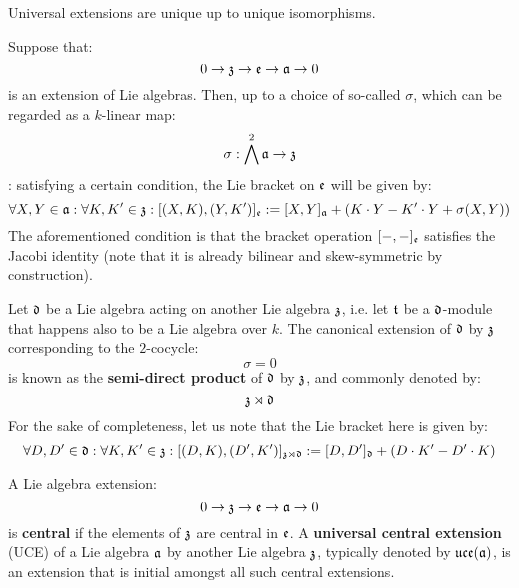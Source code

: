         \begin{remark}
            Universal extensions are unique up to unique isomorphisms. 
        \end{remark}
        \begin{remark}
            Suppose that:
                $$0 \to \mathfrak{z} \to \mathfrak{e} \to \mathfrak{a} \to 0$$
            is an extension of Lie algebras. Then, up to a choice of so-called  $\sigma$, which can be regarded as a $k$-linear map:
                $$\sigma: \bigwedge^2 \mathfrak{a} \to \mathfrak{z}$$:
            satisfying a certain condition, the Lie bracket on $\mathfrak{e}$ will be given by:
                $$\forall X, Y \in \mathfrak{a}: \forall K, K' \in \mathfrak{z}: [ (X, K), (Y, K') ]_{\mathfrak{e}} := [X, Y]_{\mathfrak{a}} + ( K \cdot Y - K' \cdot Y + \sigma(X, Y) )$$
            The aforementioned condition is that the bracket operation $[-, -]_{\mathfrak{e}}$ satisfies the Jacobi identity (note that it is already bilinear and skew-symmetric by construction).
        \end{remark}
        \begin{example}
            Let $\mathfrak{d}$ be a Lie algebra acting on another Lie algebra $\mathfrak{z}$, i.e. let $\mathfrak{t}$ be a $\mathfrak{d}$-module that happens also to be a Lie algebra over $k$. The canonical extension of $\mathfrak{d}$ by $\mathfrak{z}$ corresponding to the $2$-cocycle:
                $$\sigma = 0$$
            is known as the \textbf{semi-direct product} of $\mathfrak{d}$ by $\mathfrak{z}$, and commonly denoted by:
                $$\mathfrak{z} \rtimes \mathfrak{d}$$
            For the sake of completeness, let us note that the Lie bracket here is given by:
                $$\forall D, D' \in \mathfrak{d}: \forall K, K' \in \mathfrak{z}: [ (D, K), (D', K') ]_{\mathfrak{z} \rtimes \mathfrak{d}} := [D, D']_{\mathfrak{d}} + ( D \cdot K' - D' \cdot K )$$
        \end{example}
        \begin{definition}
            A Lie algebra extension:
                $$0 \to \mathfrak{z} \to \mathfrak{e} \to \mathfrak{a} \to 0$$
            is \textbf{central} if the elements of $\mathfrak{z}$ are central in $\mathfrak{e}$. A \textbf{universal central extension} (UCE) of a Lie algebra $\mathfrak{a}$ by another Lie algebra $\mathfrak{z}$, typically denoted by $\mathfrak{uce}(\mathfrak{a})$, is an extension that is initial amongst all such central extensions.
        \end{definition}

